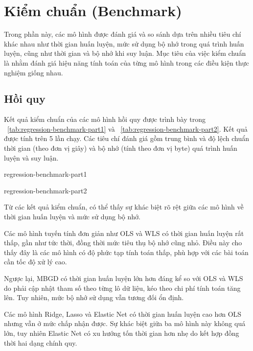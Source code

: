 \section[Kiểm chuẩn]{Kiểm chuẩn (Benchmark)}

Trong phần này, các mô hình được đánh giá và so sánh dựa trên nhiều tiêu chí
khác nhau như thời gian huấn luyện, mức sử dụng bộ nhớ trong quá trình huấn
luyện, cũng như thời gian và bộ nhớ khi suy luận. Mục tiêu của việc kiểm chuẩn
là nhằm đánh giá hiệu năng tính toán của từng mô hình trong các điều kiện thực
nghiệm giống nhau.

\subsection{Hồi quy}


Kết quả kiểm chuẩn của các mô hình hồi quy được trình bày trong
\tablename~\ref{tab:regression-benchmark-part1} và
\tablename~\ref{tab:regression-benchmark-part2}. Kết quả được tính trên 5 lần
chạy. Các tiêu chí đánh giá gồm trung bình và độ lệch chuẩn thời gian (theo đơn
vị giây) và bộ nhớ (tính theo đơn vị byte) quá trình huấn luyện và suy luận.

\begin{table}[htbp]
  \centering
  \caption{Kết quả kiểm chuẩn các mô hình hồi quy (phần 1)}
  \label{tab:regression-benchmark-part1}
  {regression-benchmark-part1}
\end{table}

\begin{table}[htbp]
  \centering
  \caption{Kết quả kiểm chuẩn các mô hình hồi quy (phần 2)}
  \label{tab:regression-benchmark-part2}
  {regression-benchmark-part2}
\end{table}

Từ các kết quả kiểm chuẩn, có thể thấy sự khác biệt rõ rệt giữa các mô hình về
thời gian huấn luyện và mức sử dụng bộ nhớ.

Các mô hình tuyến tính đơn giản như OLS và WLS có thời gian huấn luyện rất
thấp, gần như tức thời, đồng thời mức tiêu thụ bộ nhớ cũng nhỏ. Điều này cho
thấy đây là các mô hình có độ phức tạp tính toán thấp, phù hợp với các bài toán
cần tốc độ xử lý cao.

Ngược lại, MBGD có thời gian huấn luyện lớn hơn đáng kể so với OLS và WLS do
phải cập nhật tham số theo từng lô dữ liệu, kéo theo chi phí tính toán tăng
lên. Tuy nhiên, mức bộ nhớ sử dụng vẫn tương đối ổn định.

Các mô hình Ridge, Lasso và Elastic Net có thời gian huấn luyện cao hơn OLS
nhưng vẫn ở mức chấp nhận được. Sự khác biệt giữa ba mô hình này không quá lớn,
tuy nhiên Elastic Net có xu hướng tốn thời gian hơn nhẹ do kết hợp đồng thời
hai dạng chính quy.

